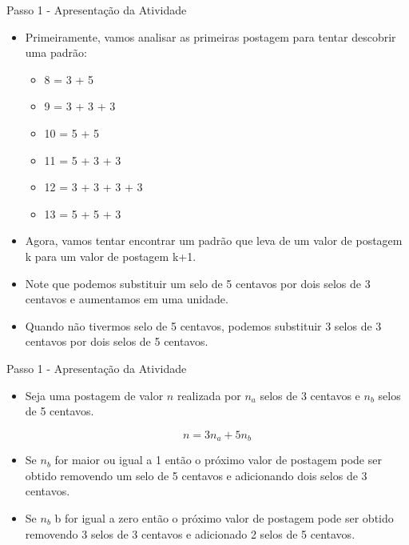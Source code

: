 \documentclass{beamer}
\begin{document}
\begin{frame}{Passo 1 - Apresentação da Atividade}

\begin{itemize}
    \item <1->Primeiramente, vamos analisar as primeiras postagem para tentar descobrir uma padrão:

    \begin{itemize}
    \item<2->  8 = 3 + 5
    \item<3->  9 = 3 + 3 + 3
    \item<4-> 10 = 5 + 5
    \item<5-> 11 = 5 + 3 + 3
    \item<6-> 12 = 3 + 3 + 3 + 3
    \item<7-> 13 = 5 + 5 + 3
\end{itemize}

   \item <8->Agora, vamos tentar encontrar um padrão que leva de um valor de postagem k para um valor de postagem k+1.  
   
   \item <9-> Note que podemos substituir um selo de 5 centavos por dois selos de 3 centavos e aumentamos em uma unidade.
   
   \item <10-> Quando não tivermos selo de 5 centavos, podemos substituir 3 selos de 3 centavos por dois selos de 5 centavos.
   
   

\end{itemize}





\end{frame}


\begin{frame}{Passo 1 - Apresentação da Atividade}

\begin{itemize}
   
\item <1-> Seja uma postagem de valor $n$ realizada por $n_a$ selos de 3 centavos e $n_b$ selos de 5 centavos.

$$n  = 3n_a + 5n_b$$


\item <2-> Se $n_b$ for maior ou igual a 1 então o próximo valor de postagem pode ser obtido removendo um selo de 5 centavos e adicionando dois selos de 3 centavos.



\item <2-> Se $n_b$ b for igual a zero então o próximo valor de postagem pode ser obtido removendo 3 selos de 3 centavos e adicionado 2 selos de 5 centavos.




\end{itemize}


\end{frame}
\end{document}
